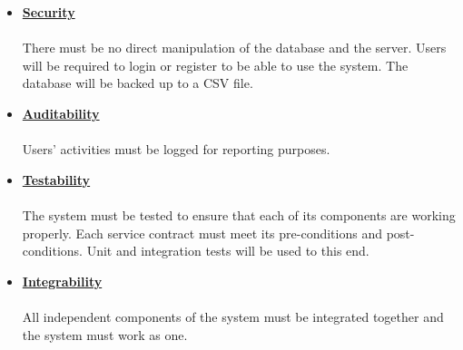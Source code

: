 \documentclass[a4paper,12pt]{article}
\begin{document}
\begin{itemize}
		\item{\bfseries \underline{Security}}\\\\
		There must be no direct manipulation of the database and the server. Users will be required to login or register to be 			able to use the system. The database will be backed up to a CSV file.
		
		\item{\bfseries \underline{Auditability}}\\\\
		Users' activities must be logged for reporting purposes.
		
		\item{\bfseries \underline{Testability}}\\\\
		The system must be tested to ensure that each of its components are working properly. Each service contract must 			meet its pre-conditions and post-conditions. Unit and integration tests will be used to this end.
		
		\item{\bfseries \underline{Integrability}}\\\\
		All independent components of the system must be integrated together and the system must work as one.
\end{itemize}

\end{document}
